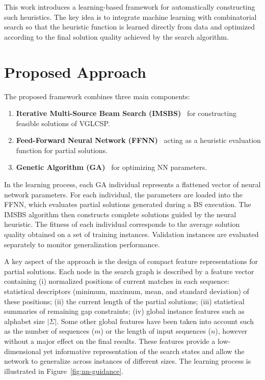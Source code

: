 \documentclass{sigplanconf}
\begin{document}
	This work introduces a learning-based framework for automatically constructing such heuristics. 
	The key idea is to integrate machine learning with combinatorial search so that the heuristic function is learned directly from data and optimized according to the final solution quality achieved by the search algorithm.
	
	\section{Proposed Approach}
	
	The proposed framework combines three main components:
	
	\begin{enumerate}
		\item \textbf{Iterative Multi-Source Beam Search (IMSBS)}~\cite{djukanovic_eurocast_2026} for constructing feasible solutions of VGLCSP.
		\item \textbf{Feed-Forward Neural Network (FFNN)}~\cite{svozil1997introduction} acting as a heuristic evaluation function for partial solutions.
		\item \textbf{Genetic Algorithm (GA)}~\cite{gonccalves2011biased} for optimizing NN parameters.
	\end{enumerate}
	
	In the learning process, each GA individual represents a flattened vector of neural network parameters. 
	For each individual, the parameters are loaded into the FFNN, which evaluates partial solutions generated during a BS execution. 
	The IMSBS algorithm then constructs complete solutions guided by the neural heuristic. The fitness of each individual corresponds to the average solution quality obtained on a set of training instances. 
	Validation instances are evaluated separately to monitor generalization performance.
	
	A key aspect of the approach is the design of compact feature representations for partial solutions. 
	Each node in the search graph is described by a feature vector containing
		(i) normalized positions of current matches in each sequence:
	     statistical descriptors (minimum, maximum, mean, and standard deviation) of these positions; (ii)  the current length of the partial solutions; (iii) statistical summaries of remaining gap constraints; (iv) global instance features such as alphabet size $|\Sigma|$. Some other global features have been taken into account such as the number of sequences ($m$) or the  length of input sequences ($n$), however without a major effect on the final results.	These features provide a low-dimensional yet informative representation of the search states and allow the network to generalize across instances of different sizes. The learning process is illustrated in Figure~\ref{fig:nn-guidance}.  
	
\end{document}

